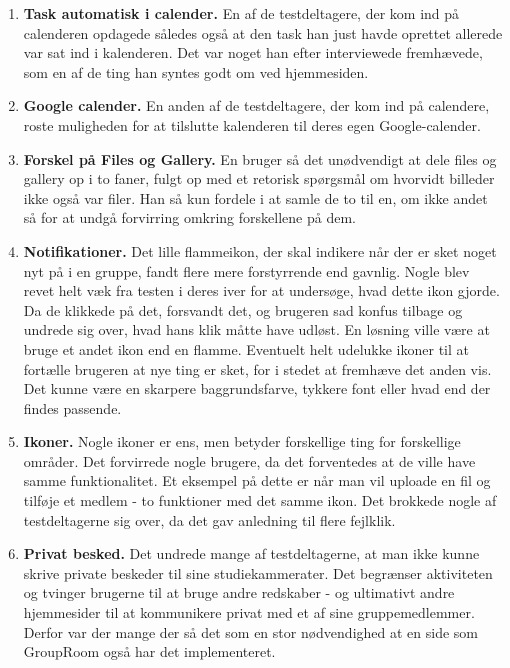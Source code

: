 \documentclass[12pt]{article}
\begin{document}
\begin{enumerate}
  \item \textbf{Task automatisk i calender.} En af de testdeltagere, der kom ind på calenderen opdagede således også at den task han just havde oprettet allerede var sat ind i kalenderen. Det var noget han efter interviewede fremhævede, som en af de ting han syntes godt om ved hjemmesiden.
  
  \item \textbf{Google calender.} En anden af de testdeltagere, der kom ind på calendere, roste muligheden for at tilslutte kalenderen til deres egen Google-calender.
    
  \item \textbf{Forskel på Files og Gallery.} En bruger så det unødvendigt at dele files og gallery op i to faner, fulgt op med et retorisk spørgsmål om hvorvidt billeder ikke også var filer. Han så kun fordele i at samle de to til en, om ikke andet så for at undgå forvirring omkring forskellene på dem.

  \item \textbf{Notifikationer.} Det lille flammeikon, der skal indikere når der er sket noget nyt på i en gruppe, fandt flere mere forstyrrende end gavnlig. Nogle blev revet helt væk fra testen i deres iver for at undersøge, hvad dette ikon gjorde. Da de klikkede på det, forsvandt det, og brugeren sad konfus tilbage og undrede sig over, hvad hans klik måtte have udløst. En løsning ville være at bruge et andet ikon end en flamme. Eventuelt helt udelukke ikoner til at fortælle brugeren at nye ting er sket, for i stedet at fremhæve det anden vis. Det kunne være en skarpere baggrundsfarve, tykkere font eller hvad end der findes passende.
  
  \item \textbf{Ikoner.} Nogle ikoner er ens, men betyder forskellige ting for forskellige områder. Det forvirrede nogle brugere, da det forventedes at de ville have samme funktionalitet. Et eksempel på dette er når man vil uploade en fil og tilføje et medlem - to funktioner med det samme ikon. Det brokkede nogle af testdeltagerne sig over, da det gav anledning til flere fejlklik.
 
  \item \textbf{Privat besked.} Det undrede mange af testdeltagerne, at man ikke kunne skrive private beskeder til sine studiekammerater. Det begrænser aktiviteten og tvinger brugerne til at bruge andre redskaber - og ultimativt andre hjemmesider til at kommunikere privat med et af sine gruppemedlemmer. Derfor var der mange der så det som en stor nødvendighed at en side som GroupRoom også har det implementeret.


\end{enumerate}
\end{document}
